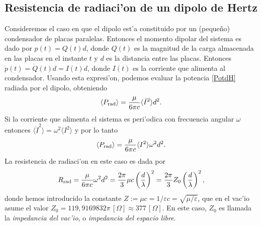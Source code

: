 \subsection{Resistencia de radiaci'on de un dipolo de Hertz}\label{sec:RRdH}
Consideremos el caso en que el dipolo est'a constituido por un (peque\~no) condensador de placas paralelas. Entonces el momento dipolar del sistema es dado por $p(t)=Q(t)d$, donde $Q(t)$ es la magnitud de la carga almacenada en las placas en el instante $t$ y $d$ es la distancia entre las placas. Entonces $\dot{p}(t)=\dot{Q}(t)d=I(t)d$, donde $I(t)$ es la corriente que alimenta al condensador. Usando esta expresi'on, podemos evaluar la potencia \eqref{PotdH} radiada por el dipolo, obteniendo
\begin{equation}
\left\langle P_{\rm rad}\right\rangle=\frac{\mu}{6\pi c}{\langle\dot{I}^2\rangle d^2}.
\end{equation}
Si la corriente que alimenta el sistema es peri'odica con frecuencia angular $\omega$ entonces $\langle\dot{I}^2\rangle=\omega^2\langle I^2\rangle$ y por lo tanto
\begin{equation}
\left\langle P_{\rm rad}\right\rangle=\frac{\mu}{6\pi c}{\langle I^2\rangle \omega^2d^2}.
\end{equation}
La resistencia de radiaci'on en este caso es dada por
\begin{equation}\label{Rradp}
R_{\rm rad}=\frac{\mu}{6\pi c}{\omega^2d^2}
=\frac{2\pi}{3}\mu c\left(\frac{d}{\lambda}\right)^2
=\frac{2\pi}{3}Z_0\left(\frac{d}{\lambda}\right)^2,
\end{equation}
donde hemos introducido la constante $Z:=\mu c=1/\varepsilon c=\sqrt{\mu/\varepsilon}$, que en el vac'io asume el valor $Z_0=119,9169832\pi\,[\Omega]\approx 377\,[\Omega]$. En este caso, $Z_0$ es llamada la \textit{impedancia del vac'io}, o \textit{impedancia del espacio libre}.

